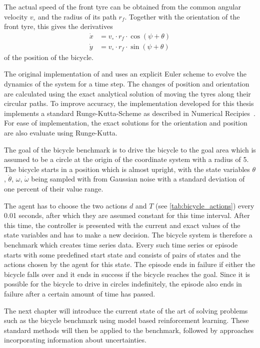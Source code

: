 The actual speed of the front tyre can be obtained from the common angular velocity $v_\circ$ and the radius of its path $r_f$.
Together with the orientation of the front tyre, this gives the derivatives
\begin{align}
    \dot{x} &= v_\circ \cdot r_f \cdot \cos(\psi + \theta) \\
    \dot{y} &= v_\circ \cdot r_f \cdot \sin(\psi + \theta)
\end{align}
of the position of the bicycle.

The original implementation of \Randlov{} and \Alstrom{} uses an explicit Euler scheme to evolve the dynamics of the system for a time step.
The changes of position and orientation are calculated using the exact analytical solution of moving the tyres along their circular paths.
To improve accuracy, the implementation developed for this thesis implements a standard Runge-Kutta-Scheme as described in Numerical Recipies~\cite[908]{press_numerical_2007}.
For ease of implementation, the exact solutions for the orientation and position are also evaluate using Runge-Kutta.

The goal of the bicycle benchmark is to drive the bicycle to the goal area which is assumed to be a circle at the origin of the coordinate system with a radius of 5.
The bicycle starts in a position which is almost upright, with the state variables $\theta$, $\dot{\theta}$, $\omega$, $\dot{\omega}$ being sampled with from Gaussian noise with a standard deviation of one percent of their value range.

The agent has to choose the two actions $d$ and $T$ (see \cref{tab:bicycle_actions}) every 0.01 seconds, after which they are assumed constant for this time interval.
After this time, the controller is presented with the current and exact values of the state variables and has to make a new decision.
The bicycle system is therefore a benchmark which creates time series data.
Every such time series or episode starts with some predefined start state and consists of pairs of states and the actions chosen by the agent for this state.
The episode ends in failure if either the bicycle falls over and it ends in success if the bicycle reaches the goal.
Since it is possible for the bicycle to drive in circles indefinitely, the episode also ends in failure after a certain amount of time has passed.

The next chapter will introduce the current state of the art of solving problems such as the bicycle benchmark using model based reinforcement learning.
These standard methods will then be applied to the benchmark, followed by approaches incorporating information about uncertainties.
